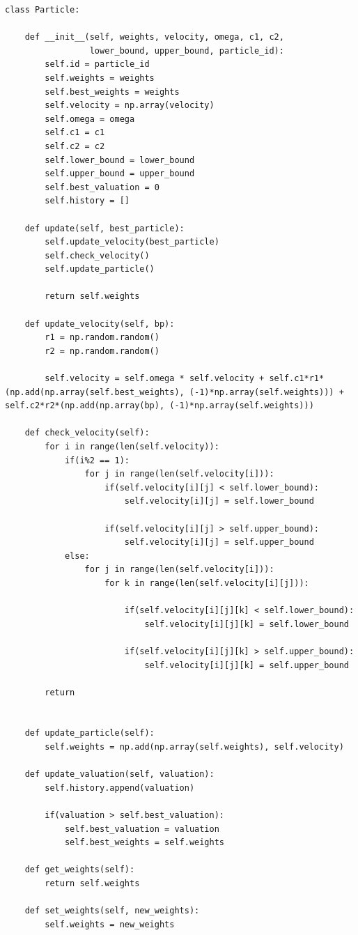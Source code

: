 \documentclass[a4paper]{article}
\begin{document}
\begin{lstlisting}[caption={Klasa korišćena za čestice},frame=single, label=particle]
class Particle:
    
    def __init__(self, weights, velocity, omega, c1, c2, 
                 lower_bound, upper_bound, particle_id):
        self.id = particle_id
        self.weights = weights
        self.best_weights = weights
        self.velocity = np.array(velocity)
        self.omega = omega
        self.c1 = c1
        self.c2 = c2
        self.lower_bound = lower_bound
        self.upper_bound = upper_bound
        self.best_valuation = 0
        self.history = []
        
    def update(self, best_particle):
        self.update_velocity(best_particle)
        self.check_velocity()
        self.update_particle()
        
        return self.weights
    
    def update_velocity(self, bp):
        r1 = np.random.random()
        r2 = np.random.random()
        
        self.velocity = self.omega * self.velocity + self.c1*r1*(np.add(np.array(self.best_weights), (-1)*np.array(self.weights))) + self.c2*r2*(np.add(np.array(bp), (-1)*np.array(self.weights))) 
        
    def check_velocity(self):
        for i in range(len(self.velocity)):
            if(i%2 == 1):
                for j in range(len(self.velocity[i])): 
                    if(self.velocity[i][j] < self.lower_bound):
                        self.velocity[i][j] = self.lower_bound
                    
                    if(self.velocity[i][j] > self.upper_bound): 
                        self.velocity[i][j] = self.upper_bound
            else: 
                for j in range(len(self.velocity[i])):
                    for k in range(len(self.velocity[i][j])):
            
                        if(self.velocity[i][j][k] < self.lower_bound):
                            self.velocity[i][j][k] = self.lower_bound
                
                        if(self.velocity[i][j][k] > self.upper_bound): 
                            self.velocity[i][j][k] = self.upper_bound
        
        return 
    
    
    def update_particle(self):
        self.weights = np.add(np.array(self.weights), self.velocity)
        
    def update_valuation(self, valuation):
        self.history.append(valuation)
        
        if(valuation > self.best_valuation):
            self.best_valuation = valuation
            self.best_weights = self.weights
            
    def get_weights(self):
        return self.weights
    
    def set_weights(self, new_weights):
        self.weights = new_weights
    

\end{lstlisting}
\end{document}
